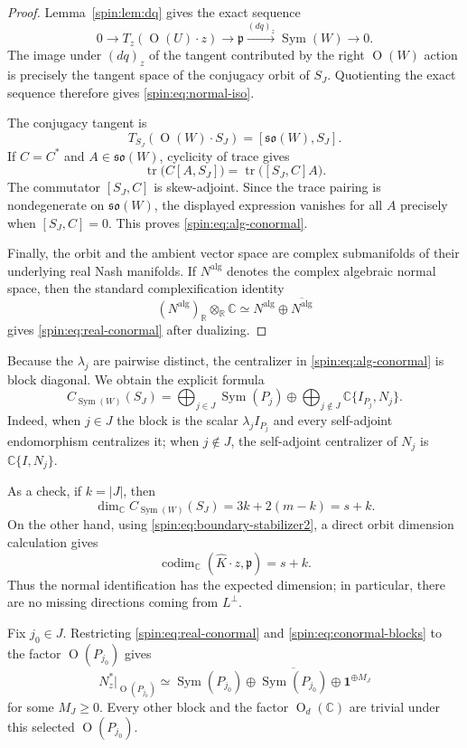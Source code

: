 \documentclass[10pt,a4paper]{amsart}
\numberwithin{equation}{section}
\newcommand{\C}{\mathbb C}
\newcommand{\R}{\mathbb R}
\newcommand{\Or}{\operatorname{O}}
\newcommand{\Sym}{\operatorname{Sym}}
\newcommand{\tr}{\operatorname{tr}}
\newcommand{\fp}{\mathfrak p}
\begin{document}
\begin{proof}
Lemma~\ref{spin:lem:dq} gives the exact sequence
\[
  0\longrightarrow T_z(\Or(U)\cdot z)
  \longrightarrow\fp
  \xrightarrow{(dq)_z}\Sym(W)
  \longrightarrow0.
\]
The image under $(dq)_z$ of the tangent contributed by the right $\Or(W)$
action is precisely the tangent space of the conjugacy orbit of $S_J$.
Quotienting the exact sequence therefore gives \eqref{spin:eq:normal-iso}.

The conjugacy tangent is
\[
  T_{S_J}(\Or(W)\cdot S_J)
  =[\mathfrak{so}(W),S_J].
\]
If $C=C^*$ and $A\in\mathfrak{so}(W)$, cyclicity of trace gives
\[
  \tr\bigl(C[A,S_J]\bigr)
  =\tr\bigl([S_J,C]A\bigr).
\]
The commutator $[S_J,C]$ is skew-adjoint.  Since the trace pairing is
nondegenerate on $\mathfrak{so}(W)$, the displayed expression vanishes for all
$A$ precisely when $[S_J,C]=0$.  This proves \eqref{spin:eq:alg-conormal}.

Finally, the orbit and the ambient vector space are complex submanifolds of
their underlying real Nash manifolds.  If $N^{\mathrm{alg}}$ denotes the
complex algebraic normal space, then the standard complexification identity
\[
  (N^{\mathrm{alg}})_{\R}\otimes_{\R}\C
  \simeq
  N^{\mathrm{alg}}\oplus\overline{N^{\mathrm{alg}}}
\]
gives \eqref{spin:eq:real-conormal} after dualizing.
\end{proof}

Because the $\lambda_j$ are pairwise distinct, the centralizer in
\eqref{spin:eq:alg-conormal} is block diagonal.  We obtain the explicit formula
\begin{equation}\label{spin:eq:conormal-blocks}
  C_{\Sym(W)}(S_J)
  =
  \bigoplus_{j\in J}\Sym(P_j)
  \oplus
  \bigoplus_{j\notin J}\C\{I_{P_j},N_j\}.
\end{equation}
Indeed, when $j\in J$ the block is the scalar $\lambda_jI_{P_j}$ and every
self-adjoint endomorphism centralizes it; when $j\notin J$, the self-adjoint
centralizer of $N_j$ is $\C\{I,N_j\}$.

As a check, if $k=|J|$, then
\[
  \dim_\C C_{\Sym(W)}(S_J)
  =3k+2(m-k)=s+k.
\]
On the other hand, using \eqref{spin:eq:boundary-stabilizer2}, a direct orbit
dimension calculation gives
\[
  \operatorname{codim}_\C(\widehat K\cdot z,\fp)=s+k.
\]
Thus the normal identification has the expected dimension; in particular,
there are no missing directions coming from $L^\perp$.

Fix $j_0\in J$.  Restricting \eqref{spin:eq:real-conormal} and
\eqref{spin:eq:conormal-blocks} to the factor $\Or(P_{j_0})$ gives
\begin{equation}\label{spin:eq:factor-conormal}
  N_z^*|_{\Or(P_{j_0})}
  \simeq
  \Sym(P_{j_0})
  \oplus\overline{\Sym(P_{j_0})}
  \oplus\mathbf1^{\oplus M_J}
\end{equation}
for some $M_J\ge0$.  Every other block and the factor $\Or_d(\C)$ are trivial
under this selected $\Or(P_{j_0})$.
\end{document}
